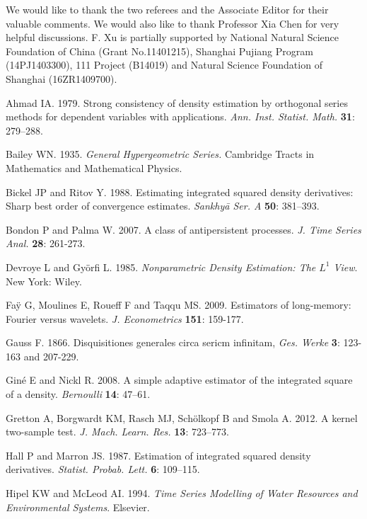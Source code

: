 \documentclass[11pt]{article}
\begin{document}
We would like to thank the two referees and the Associate Editor for their valuable comments. We would also like to thank Professor Xia Chen for very helpful discussions. F. Xu is partially supported by National Natural  Science Foundation of China (Grant No.11401215), Shanghai Pujiang Program (14PJ1403300), 111 Project (B14019) and Natural Science Foundation of Shanghai (16ZR1409700). 



\bigskip
\bigskip


\begin{thebibliography}{99}

Ahmad IA. 1979.  Strong consistency of density estimation by orthogonal series methods for dependent variables
 with applications. {\it Ann. Inst. Statist. Math.} \textbf{31}: 279--288.

Bailey WN. 1935.  {\it General Hypergeometric Series.}  Cambridge Tracts in Mathematics and Mathematical Physics. 

Bickel JP and Ritov Y. 1988.  Estimating integrated squared density derivatives: Sharp best order of
convergence estimates. {\it Sankhy\={a} Ser.  A} \textbf{50}: 381--393.

Bondon P and  Palma W. 2007.  A class of antipersistent processes. {\it J. Time Series Anal. } {\bf 28}: 261-273.

Devroye L and Gy\"{o}rfi L. 1985. {\it Nonparametric Density Estimation: The $L^1$ View}. New York: Wiley.

Fa\"{y} G,  Moulines E,  Roueff F and  Taqqu MS.  2009.   Estimators of long-memory: Fourier versus wavelets. \textit{J. Econometrics} {\bf 151}: 159-177. 

Gauss F. 1866. Disquisitiones generales circa sericm infinitam, {\it Ges. Werke}  {\bf 3}: 
123-163 and 207-229.

Gin\'{e} E  and Nickl R. 2008.  A simple adaptive estimator of the integrated square of a density.  {\it Bernoulli} \textbf{14}:  47--61.

Gretton A, Borgwardt KM,  Rasch MJ, Sch\"{o}lkopf B and Smola A. 2012. A kernel two-sample test. {\it J. Mach. Learn.   Res.} \textbf{13}: 723--773.

Hall P and Marron JS. 1987. Estimation of integrated squared density derivatives. {\it Statist. Probab. Lett.} \textbf{6}: 109--115.

Hipel KW and McLeod AI. 1994.
{\it Time Series Modelling of Water Resources and Environmental Systems}. Elsevier. 


\end{thebibliography}
\end{document}
